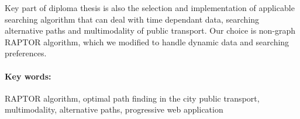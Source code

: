\documentclass[12pt, oneside]{book}
\begin{document}
Key part of diploma thesis is also the selection and implementation of applicable searching algorithm that can deal with time dependant data, searching alternative paths and multimodality of public transport.  
Our choice is non-graph RAPTOR algorithm, which we modified to handle dynamic data and searching preferences.

\paragraph*{Key words:}
RAPTOR algorithm, optimal path finding in the city public transport, multimodality, alternative paths, progressive web application


\newpage 

\tableofcontents



\newpage 

\listoffigures
\listoftables


\mainmatter


 



% 











\newpage	

\backmatter

\thispagestyle{empty}
\nocite{*}
\clearpage


 



%
%
%
%
\end{document}
